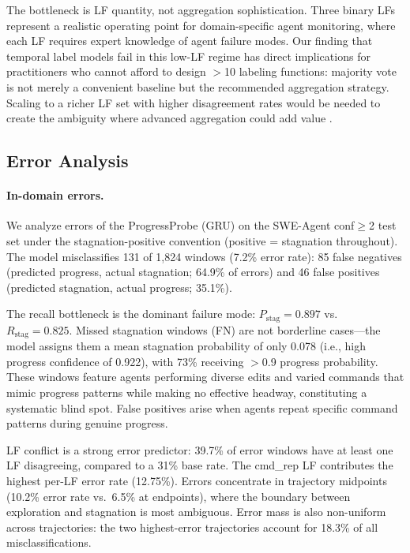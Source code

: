 The bottleneck is LF quantity, not aggregation sophistication.
Three binary LFs represent a realistic operating point for domain-specific agent monitoring, where each LF requires expert knowledge of agent failure modes.
Our finding that temporal label models fail in this low-LF regime has direct implications for practitioners who cannot afford to design ${>}$10 labeling functions: majority vote is not merely a convenient baseline but the recommended aggregation strategy.
Scaling to a richer LF set with higher disagreement rates would be needed to create the ambiguity where advanced aggregation could add value \citep{ratner2019snorkel}.

\subsection{Error Analysis}
\label{sec:app_error_analysis}

\paragraph{In-domain errors.}
We analyze errors of the ProgressProbe (GRU) on the SWE-Agent conf${\geq}$2 test set under the stagnation-positive convention (positive = stagnation throughout).
The model misclassifies 131 of 1,824 windows (7.2\% error rate): 85 false negatives (predicted progress, actual stagnation; 64.9\% of errors) and 46 false positives (predicted stagnation, actual progress; 35.1\%).

The recall bottleneck is the dominant failure mode: $P_\text{stag}{=}0.897$ vs.\ $R_\text{stag}{=}0.825$.
Missed stagnation windows (FN) are not borderline cases---the model assigns them a mean stagnation probability of only 0.078 (i.e., high progress confidence of 0.922), with 73\% receiving $>$0.9 progress probability.
These windows feature agents performing diverse edits and varied commands that mimic progress patterns while making no effective headway, constituting a systematic blind spot.
False positives arise when agents repeat specific command patterns during genuine progress.

LF conflict is a strong error predictor: 39.7\% of error windows have at least one LF disagreeing, compared to a 31\% base rate.
The cmd\_rep LF contributes the highest per-LF error rate (12.75\%).
Errors concentrate in trajectory midpoints (10.2\% error rate vs.\ 6.5\% at endpoints), where the boundary between exploration and stagnation is most ambiguous.
Error mass is also non-uniform across trajectories: the two highest-error trajectories account for 18.3\% of all misclassifications.


